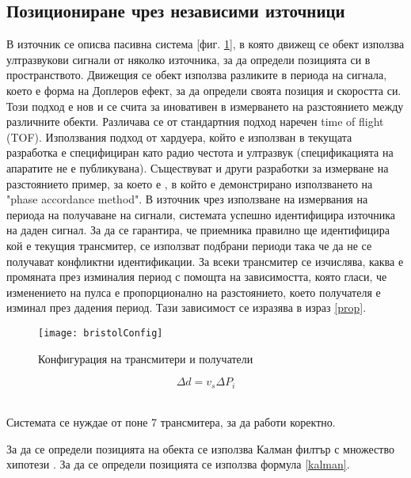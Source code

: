 \subsection{Позициониране чрез независими източници}

В източник \cite{bristolBeacons} се описва пасивна система [фиг. \ref{bristolVis}], в която движещ се обект използва ултразвукови сигнали от няколко източника, за да определи позицията си в пространството. Движещия се обект използва разликите в периода на сигнала, което е форма на Доплеров ефект, за да определи своята позиция и скоростта си. Този подход е нов и се счита за иновативен в измерването на разстоянието между различните обекти. Различава се от стандартния подход наречен time of flight (TOF). Използвания подход от хардуера, който е използван в текущата разработка е специфициран като радио честота и ултразвук \cite{hexamite} (спецификацията на апаратите не е публикувана). Съществуват и други разработки за измерване на разстоянието пример, за което е \cite{fastAndAccurate}, в който е демонстрирано използването на "phase accordance method". В източник \cite{bristolBeacons} чрез използване на измервания на периода на получаване на сигнали, системата успешно идентифицира източника на даден сигнал. За да се гарантира, че приемника правилно ще идентифицира кой е текущия трансмитер, се използват подбрани периоди така че да не се получават конфликтни идентификации. За всеки трансмитер се изчислява, каква е промяната през изминалия период с помощта на зависимостта, която гласи, че изменението на пулса е пропорционално на разстоянието, което получателя е изминал през дадения период. Тази зависимост се изразява в израз \ref{prop}.

\begin{figure}
    \centering
    \centerline{\texttt{[image: bristolConfig]}}
    \caption{Конфигурация на трансмитери и получатели}
    \label{bristolVis}
\end{figure}


\centerline{\begin{equation} \label{prop}
    \Delta d = v_s \Delta P_i
\end{equation}} \\

Системата се нуждае от поне 7 трансмитера, за да работи коректно.

За да се определи позицията на обекта се използва Калман филтър с множество хипотези \cite{kalmanFilter}. За да се определи позицията се използва формула \ref{kalman}.

